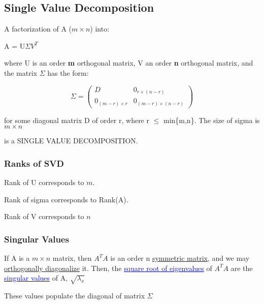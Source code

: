 \documentclass{article}
\newcommand{\bul}[1]{\textcolor{blue}{\underline{#1}}}
\begin{document}
\subsection{Single Value Decomposition}
A factorization of A ($m \times n$) into:
\begin{center}
    A = U$\Sigma V^T$
\end{center}
where U is an order \textbf{m} orthogonal matrix, V an order \textbf{n} orthogonal matrix, and the matrix $\Sigma$ has the form:
\begin{center}
    \[\Sigma = \begin{pmatrix}
        D & 0_{r\times(n-r)}\\
        0_{(m-r)\times r} & 0_{(m-r)\times(n-r)}
    \end{pmatrix}\]
\end{center}
for some diagonal matrix D of order r, where r $\leq$ min\{m,n\}. The size of sigma is $m \times n$

is a SINGLE VALUE DECOMPOSITION.

\subsubsection{Ranks of SVD}
Rank of U corresponds to $m$.

Rank of sigma corresponds to Rank(A).

Rank of V corresponds to $n$

\subsubsection{Singular Values}
If A is a $m\times n$ matrix, then $A^TA$ is an order n \underline{symmetric matrix}, and we may \underline{orthogonally diagonalize} it. Then, the \bul{square root of eigenvalues} of $A^TA$ are the \bul{singular values} of A, $\sqrt{\lambda_x}$

These values populate the diagonal of matrix $\Sigma$
\end{document}
